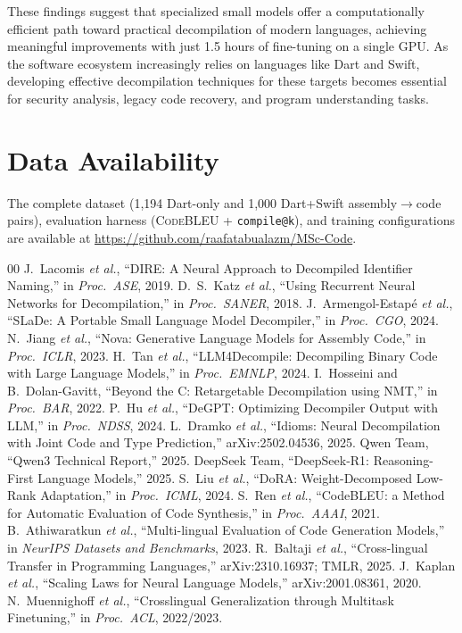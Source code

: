 \documentclass[10pt,conference]{IEEEtran}
\makeatletter
\newcommand{\codebleu}{\textsc{CodeBLEU}\xspace}
\newcommand{\compileatk}{\texttt{compile@k}\xspace}
\makeatother
\begin{document}
These findings suggest that specialized small models offer a computationally efficient path toward practical decompilation of modern languages, achieving meaningful improvements with just 1.5 hours of fine-tuning on a single GPU. As the software ecosystem increasingly relies on languages like Dart and Swift, developing effective decompilation techniques for these targets becomes essential for security analysis, legacy code recovery, and program understanding tasks.

\section*{Data Availability}
The complete dataset (1,194 Dart-only and 1,000 Dart+Swift assembly$\rightarrow$code pairs), evaluation harness (\codebleu{} + \compileatk), and training configurations are available at \url{https://github.com/raafatabualazm/MSc-Code}.

\balance
\begin{thebibliography}{00}
 J.~Lacomis \emph{et al.}, ``DIRE: A Neural Approach to Decompiled Identifier Naming,'' in \emph{Proc.\ ASE}, 2019.
 D.~S.~Katz \emph{et al.}, ``Using Recurrent Neural Networks for Decompilation,'' in \emph{Proc.\ SANER}, 2018.
 J.~Armengol-Estapé \emph{et al.}, ``SLaDe: A Portable Small Language Model Decompiler,'' in \emph{Proc.\ CGO}, 2024.
 N.~Jiang \emph{et al.}, ``Nova: Generative Language Models for Assembly Code,'' in \emph{Proc.\ ICLR}, 2023.
 H.~Tan \emph{et al.}, ``LLM4Decompile: Decompiling Binary Code with Large Language Models,'' in \emph{Proc.\ EMNLP}, 2024.
 I.~Hosseini and B.~Dolan-Gavitt, ``Beyond the C: Retargetable Decompilation using NMT,'' in \emph{Proc.\ BAR}, 2022.
 P.~Hu \emph{et al.}, ``DeGPT: Optimizing Decompiler Output with LLM,'' in \emph{Proc.\ NDSS}, 2024.
 L.~Dramko \emph{et al.}, ``Idioms: Neural Decompilation with Joint Code and Type Prediction,'' arXiv:2502.04536, 2025.
 Qwen Team, ``Qwen3 Technical Report,'' 2025.
 DeepSeek Team, ``DeepSeek-R1: Reasoning-First Language Models,'' 2025.
 S.~Liu \emph{et al.}, ``DoRA: Weight-Decomposed Low-Rank Adaptation,'' in \emph{Proc.\ ICML}, 2024.
 S.~Ren \emph{et al.}, ``CodeBLEU: a Method for Automatic Evaluation of Code Synthesis,'' in \emph{Proc.\ AAAI}, 2021.
 B.~Athiwaratkun \emph{et al.}, ``Multi-lingual Evaluation of Code Generation Models,'' in \emph{NeurIPS Datasets and Benchmarks}, 2023.
 R.~Baltaji \emph{et al.}, ``Cross-lingual Transfer in Programming Languages,'' arXiv:2310.16937; TMLR, 2025.
 J.~Kaplan \emph{et al.}, ``Scaling Laws for Neural Language Models,'' arXiv:2001.08361, 2020.
 N.~Muennighoff \emph{et al.}, ``Crosslingual Generalization through Multitask Finetuning,'' in \emph{Proc.\ ACL}, 2022/2023.
\end{thebibliography}
\end{document}
